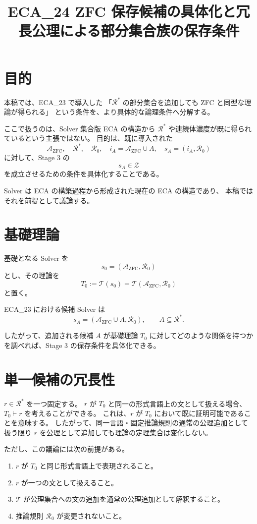 \documentclass[a4paper,11pt]{article}
\title{ECA_24 ZFC 保存候補の具体化と冗長公理による部分集合族の保存条件}
\author{}
\date{}
\begin{document}
\maketitle

\section{目的}

本稿では、ECA_23 で導入した
「$\mathcal{R}^*$ の部分集合を追加しても ZFC と同型な理論が得られる」
という条件を、より具体的な論理条件へ分解する。

ここで扱うのは、Solver 集合版 ECA の構造から
$\mathcal{R}^*$ や連続体濃度が既に得られているという主張ではない。
目的は、既に導入された
\[
\mathcal{A}_{\mathrm{ZFC}},\quad
\mathcal{R}^*,\quad
\mathcal{R}_0,\quad
i_A=\mathcal{A}_{\mathrm{ZFC}}\cup A,\quad
s_A=(i_A,\mathcal{R}_0)
\]
に対して、Stage 3 の
\[
s_A\in\mathcal{Z}
\]
を成立させるための条件を具体化することである。

Solver は ECA の構築過程から形成された現在の ECA の構造であり、
本稿ではそれを前提として議論する。

\section{基礎理論}

基礎となる Solver を
\[
s_0=(\mathcal{A}_{\mathrm{ZFC}},\mathcal{R}_0)
\]
とし、その理論を
\[
T_0:=\mathcal{T}(s_0)
=\mathcal{T}(\mathcal{A}_{\mathrm{ZFC}},\mathcal{R}_0)
\]
と置く。

ECA_23 における候補 Solver は
\[
s_A=(\mathcal{A}_{\mathrm{ZFC}}\cup A,\mathcal{R}_0),
\qquad
A\subseteq\mathcal{R}^*.
\]

したがって、追加される候補 $A$ が基礎理論 $T_0$ に対してどのような関係を持つかを調べれば、Stage 3 の保存条件を具体化できる。

\section{単一候補の冗長性}
$r\in\mathcal{R}^*$ を一つ固定する。
$r$ が $T_0$ と同一の形式言語上の文として扱える場合、$T_0\vdash r$ を考えることができる。
これは、$r$ が $T_0$ において既に証明可能であることを意味する。
したがって、同一言語・固定推論規則の通常の公理追加として扱う限り $r$ を公理として追加しても理論の定理集合は変化しない。

ただし、この議論には次の前提がある。

\begin{enumerate}
\item $r$ が $T_0$ と同じ形式言語上で表現されること。
\item $r$ が一つの文として扱えること。
\item $\mathcal{T}$ が公理集合への文の追加を通常の公理追加として解釈すること。
\item 推論規則 $\mathcal{R}_0$ が変更されないこと。
\end{enumerate}
\end{document}
